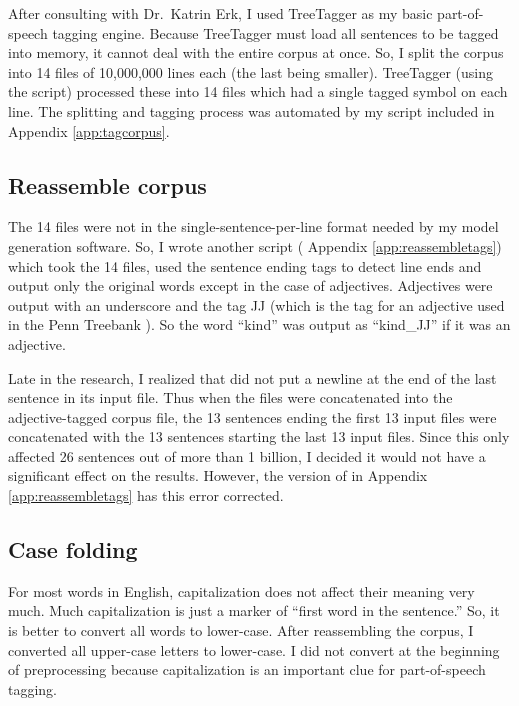 \documentclass[eric_thesis.tex]{subfiles}
\begin{document}
After consulting with Dr.\ Katrin Erk,  I used TreeTagger  as my basic part-of-speech 
tagging engine. Because TreeTagger must load all sentences to be tagged into 
memory, it cannot deal with the entire corpus at once. So, I split the corpus 
into 14 files of 10,000,000 lines each (the last being smaller). TreeTagger 
(using the  script) processed these into 14 
files which had a single tagged symbol on each line. The splitting and tagging 
process was automated by my  script included in 
Appendix \ref{app:tagcorpus}.

\subsection{Reassemble corpus}

The 14 files were not in the single-sentence-per-line format needed by my model 
generation software. So, I wrote another script ( 
Appendix \ref{app:reassembletags}) which took the 14 files, used the sentence 
ending tags to detect line ends and output only the original words except in the 
case of adjectives. Adjectives were output with an underscore and the tag JJ 
(which is the tag for an adjective used in the Penn Treebank ). So 
the word ``kind'' was output as ``kind\_JJ'' if it was an adjective.

Late in the research, I realized that  did not 
put a newline at the end of the last sentence in its input file. Thus when the 
files were concatenated into the adjective-tagged corpus file, the 13 sentences 
ending the first 13 input files were concatenated with the 13 sentences starting 
the last 13 input files. Since this only affected 26 sentences out of more than 
1 billion, I decided it would not have a significant effect on the results. 
However, the version of  in Appendix 
\ref{app:reassembletags} has this error corrected.

\subsection{Case folding}

For most words in English, capitalization does not affect their meaning very 
much. Much capitalization is just a marker of ``first word in the sentence.'' 
So, it is better to convert all words to lower-case. After reassembling the 
corpus, I converted all upper-case letters to lower-case. I did not convert at 
the beginning of preprocessing because capitalization is an important clue for 
part-of-speech tagging.
\end{document}
